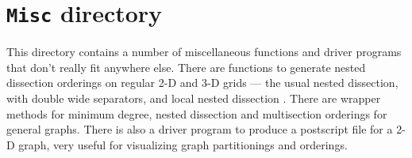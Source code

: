 \par
\chapter{{\tt Misc} directory}
\label{chapter:Misc}
\par
This directory contains a number of miscellaneous functions and
driver programs that don't really fit anywhere else.
There are functions to generate nested dissection orderings on
regular 2-D and 3-D grids --- the usual nested dissection, with
double wide separators, and local nested dissection
\cite{bha93-localND}.
There are wrapper methods for minimum degree, 
nested dissection and multisection
orderings for general graphs.
There is also a driver program to produce a postscript file for a 2-D
graph, very useful for visualizing graph partitionings and
orderings.
